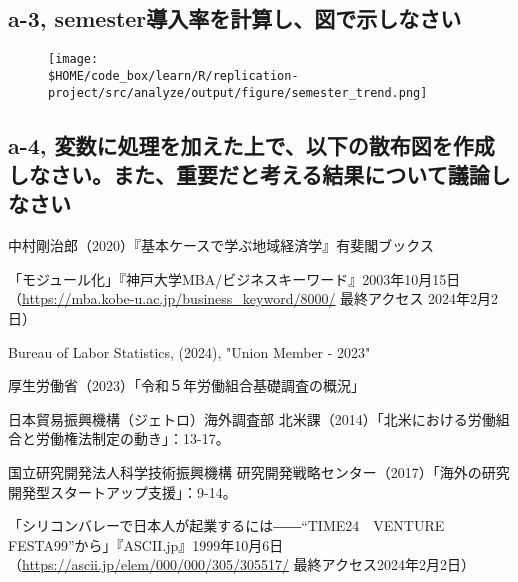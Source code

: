 \documentclass[a4paper]{jsarticle}
\begin{document}
\subsection*{a-3, semester導入率を計算し、図で示しなさい}

\begin{figure}[H]
  \centering
  \texttt{[image: \\\$HOME/code\_box/learn/R/replication-project/src/analyze/output/figure/semester\_trend.png]}

\end{figure}

\subsection*{a-4, 変数に処理を加えた上で、以下の散布図を作成しなさい。また、重要だと考える結果について議論しなさい}



\begin{thebibliography}{9}
  中村剛治郎（2020）『基本ケースで学ぶ地域経済学』有斐閣ブックス

  「モジュール化」『神戸大学MBA/ビジネスキーワード』2003年10月15日（\url{https://mba.kobe-u.ac.jp/business_keyword/8000/} 最終アクセス 2024年2月2日）

  Bureau of Labor Statistics, (2024), "Union Member - 2023"

  厚生労働省（2023）「令和５年労働組合基礎調査の概況」

  日本貿易振興機構（ジェトロ）海外調査部 北米課（2014）「北米における労働組合と労働権法制定の動き」：13-17。

  国立研究開発法人科学技術振興機構 研究開発戦略センター（2017）「海外の研究開発型スタートアップ支援」：9-14。

  「シリコンバレーで日本人が起業するには――“TIME24　VENTURE　FESTA99”から」『ASCII.jp』1999年10月6日（\url{https://ascii.jp/elem/000/000/305/305517/} 最終アクセス2024年2月2日）
\end{thebibliography}
\end{document}
